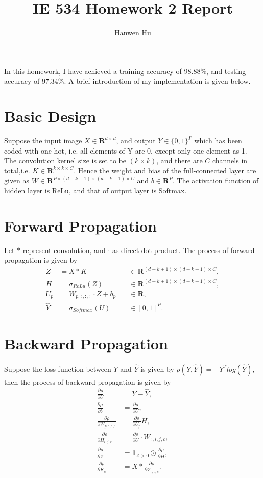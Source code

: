 \documentclass[12pt]{article}
\title{IE 534 Homework 2 Report}
\author{Hanwen Hu}
\begin{document}
In this homework, I have achieved a training accuracy of 98.88\%, and testing accuracy of 97.34\%. A brief introduction of my implementation is given below.\\

\section{Basic Design}
Suppose the input image $X\in \mathbf{R}^{d\times d}$, and output $Y\in \{0,1\}^{P}$ which has been coded with one-hot, i.e. all elements of Y are 0, except only one element as 1. The convolution kernel size is set to be $(k\times k)$, and there are $C$ channels in total,i.e. $K\in \mathbf{R}^{k\times k\times C}$. Hence the weight and bias of the full-connected layer are given as $W\in \mathbf{R}^{P\times (d-k+1)\times (d-k+1)\times C}$ and $b\in \mathbf{R}^{P}$. The activation function of hidden layer is ReLu, and that of output layer is Softmax.\\

\section{Forward Propagation}
Let $*$ represent convolution, and $\cdotp$ as direct dot product. The process of forward propagation is given by
\begin{equation}
\begin{aligned}
  Z &= X * K\quad &\in \mathbf{R}^{(d-k+1)\times (d-k+1)\times C},\\
H &= \sigma_{ReLu}(Z)\quad &\in \mathbf{R}^{(d-k+1)\times (d-k+1)\times C},\\
U_p &= W_{p,:,:,:}\cdotp Z + b_p\quad &\in \mathbf{R},\\
\hat{Y} &= \sigma_{Softmax}(U)\quad &\in [0,1]^P.
\end{aligned}
\end{equation}

\section{Backward Propagation}
Suppose the loss function between $Y$ and $\hat{Y}$ is given by $\rho(Y,\hat{Y})=-Y^T log(\hat{Y})$, then the process of backward propagation is given by
\begin{equation}
\begin{aligned}
\frac{\partial \rho}{\partial U} &= Y - \hat{Y},\\
\frac{\partial \rho}{\partial b} &= \frac{\partial \rho}{\partial U},\\
\frac{\partial \rho}{\partial W_{p,:,:,:}} &= \frac{\partial \rho}{\partial U_p}H,\\
\frac{\partial \rho}{\partial H_{i,j,c}} &= \frac{\partial \rho}{\partial U}\cdotp W_{:,i,j,c},\\
\frac{\partial \rho}{\partial Z} &= \mathbf{1}_{Z>0} \odot \frac{\partial \rho}{\partial H},\\
\frac{\partial \rho}{\partial K_c} &= X * \frac{\partial \rho}{\partial Z_{:,:,c}}.
\end{aligned}
\end{equation}
\end{document}
